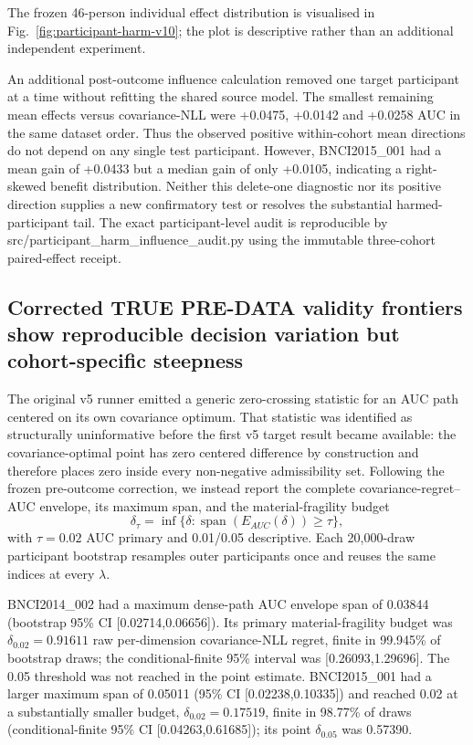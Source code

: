 The frozen 46-person individual effect distribution is visualised in
Fig.~\ref{fig:participant-harm-v10}; the plot is descriptive rather than
an additional independent experiment.

An additional post-outcome influence calculation removed one target
participant at a time without refitting the shared source model. The smallest
remaining mean effects versus covariance-NLL were +0.0475, +0.0142 and
+0.0258 AUC in the same dataset order. Thus the observed positive
within-cohort mean directions do not depend on any single test participant.
However, BNCI2015\_001 had a mean gain of +0.0433 but a median gain of only
+0.0105, indicating a right-skewed benefit distribution. Neither this
delete-one diagnostic nor its positive direction supplies a new
confirmatory test or resolves the substantial harmed-participant tail.
The exact participant-level audit is reproducible by
src/participant\_harm\_influence\_audit.py using the immutable three-cohort
paired-effect receipt.

\subsection{Corrected TRUE PRE-DATA validity frontiers show reproducible decision variation but cohort-specific steepness}
The original v5 runner emitted a generic zero-crossing statistic for an AUC
path centered on its own covariance optimum. That statistic was identified as
structurally uninformative before the first v5 target result became available:
the covariance-optimal point has zero centered difference by construction and
therefore places zero inside every non-negative admissibility set. Following
the frozen pre-outcome correction, we instead report the complete
covariance-regret--AUC envelope, its maximum span, and the
material-fragility budget
\[
 \delta_\tau=
 \inf\{\delta:
 \operatorname{span}(E_{AUC}(\delta))\ge\tau\},
\]
with \(\tau=0.02\) AUC primary and 0.01/0.05 descriptive. Each
20,000-draw participant bootstrap resamples outer participants once and reuses
the same indices at every \(\lambda\).

BNCI2014\_002 had a maximum dense-path AUC envelope span of 0.03844
(bootstrap 95\% CI [0.02714,0.06656]). Its primary material-fragility budget
was \(\delta_{0.02}=0.91611\) raw per-dimension covariance-NLL regret,
finite in 99.945\% of bootstrap draws; the conditional-finite 95\% interval
was [0.26093,1.29696]. The 0.05 threshold was not reached in the point
estimate. BNCI2015\_001 had a larger maximum span of 0.05011
(95\% CI [0.02238,0.10335]) and reached 0.02 at a substantially smaller
budget, \(\delta_{0.02}=0.17519\), finite in 98.77\% of draws
(conditional-finite 95\% CI [0.04263,0.61685]); its point
\(\delta_{0.05}\) was 0.57390.

